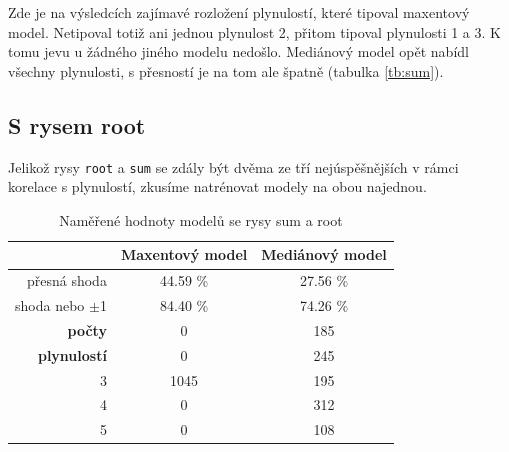 \documentclass[12pt,a4paper]{report}
\begin{document}
Zde je na výsledcích zajímavé rozložení plynulostí, které tipoval maxentový model. Netipoval totiž ani jednou plynulost 2, přitom tipoval plynulosti 1 a 3. K tomu jevu u žádného jiného modelu nedošlo. Mediánový model opět nabídl všechny plynulosti, s přesností je na tom ale špatně (tabulka \ref{tb:sum}).



\subsection{S rysem root}
Jelikož rysy \texttt{root} a \texttt{sum} se zdály být dvěma ze tří nejúspěšnějších v rámci korelace s plynulostí, zkusíme natrénovat modely na obou najednou.

\begin{table}[!htbp]
\begin{center}
\begin{tabular}{|r|c|c|}
\hline
 & \textbf{Maxentový model} & \textbf{Mediánový model} \\
 \hline
přesná shoda & 44.59 \%  & 27.56 \%  \\
\hline
shoda nebo $\pm$1 & 84.40 \% & 74.26 \%  \\
\hline
     \textbf{počty} \quad 1 & \color{red}0   & \color{OliveGreen}185   \\
\textbf{plynulostí} \quad 2 & \color{red}0   & \color{OliveGreen}245   \\
                          3 & 1045           & \color{OliveGreen}195 \\
                          4 & \color{red}0   & \color{OliveGreen}312 \\
                          5 & \color{red}0   & \color{OliveGreen}108  \\
\hline
\end{tabular}
\caption{Naměřené hodnoty modelů se rysy sum a root}\label{tb:sumroot}
\end{center}
\end{table}

\end{document}
